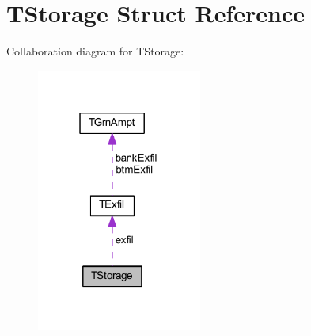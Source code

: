 \hypertarget{struct_t_storage}{}\section{T\+Storage Struct Reference}
\label{struct_t_storage}


Collaboration diagram for T\+Storage\+:
\nopagebreak
\begin{figure}[H]
\begin{center}
\leavevmode
\includegraphics[width=154pt]{d6/d02/struct_t_storage__coll__graph}
\end{center}
\end{figure}
